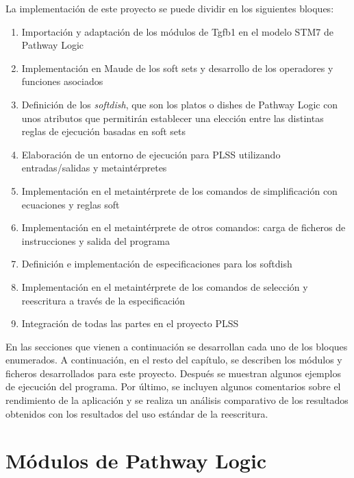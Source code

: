 La implementación de este proyecto se puede dividir en los siguientes bloques:
\begin{enumerate}
\item Importación y adaptación de los módulos de Tgfb1 en el modelo STM7 de Pathway Logic
\item Implementación en Maude de los soft sets y desarrollo de los operadores y funciones asociados
\item Definición de los \textit{softdish}, que son los platos o dishes de Pathway Logic con unos atributos que permitirán establecer una elección entre las distintas reglas de ejecución basadas en soft sets
\item Elaboración de un entorno de ejecución para PLSS utilizando entradas/salidas y metaintérpretes
\item Implementación en el metaintérprete de los comandos de simplificación con ecuaciones y reglas soft
\item Implementación en el metaintérprete de otros comandos: carga de ficheros de instrucciones y salida del programa
\item Definición e implementación de especificaciones para los softdish
\item Implementación en el metaintérprete de los comandos de selección y reescritura a través de la especificación
\item Integración de todas las partes en el proyecto PLSS
\end{enumerate}
\medskip

En las secciones que vienen a continuación se desarrollan cada uno de los bloques enumerados.
A continuación, en el resto del capítulo, se describen los módulos y ficheros desarrollados para este proyecto.
Después se muestran algunos ejemplos de ejecución del programa.
Por último, se incluyen algunos comentarios sobre el rendimiento de la aplicación y se realiza un análisis comparativo de los resultados obtenidos con los resultados del uso estándar de la reescritura.
\medskip


\section{Módulos de Pathway Logic}

